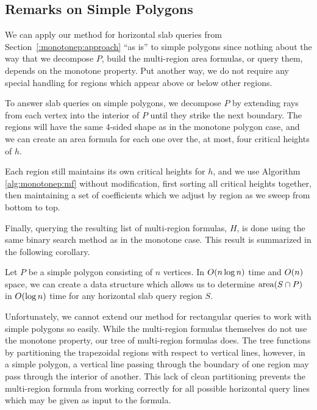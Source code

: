 \subsection{Remarks on Simple Polygons}
\label{:monotonep:simplep}

We can apply our method for horizontal slab queries from Section~\ref{:monotonep:approach} ``as is'' to simple polygons since nothing about the way that we decompose $P$, build the multi-region area formulas, or query them, depends on the monotone property.
Put another way, we do not require any special handling for regions which appear above or below other regions.

To answer slab queries on simple polygons, we decompose $P$ by extending rays from each vertex into the interior of $P$ until they strike the next boundary.  The regions will have the same 4-sided shape as in the monotone polygon case, and we can create an area formula for each one over the, at most, four critical heights of $h$.

Each region still maintains its own critical heights for $h$, and we use Algorithm \ref{alg:monotonep:mf} without modification, first sorting all critical heights together, then maintaining a set of coefficients which we adjust by region as we sweep from bottom to top.

Finally, querying the resulting list of multi-region formulas, $H$, is done using the same binary search method as in the monotone case. This result is summarized in the following corollary.

\begin{corollary}
\label{cor:monotonep:simplep-area}
Let $P$ be a simple polygon consisting of $n$ vertices.
In $O\!\left(n \log{n}\right)$ time and $O\!\left(n\right)$ space, we can create a data structure which allows us to determine $\operatorname{area}\!\left(S \cap P\right)$ in $O\!\left(\log{n}\right)$ time for any horizontal slab query region $S$.
\end{corollary}

Unfortunately, we cannot extend our method for rectangular queries to work with simple polygons so easily.
While the multi-region formulas themselves do not use the monotone property, our tree of multi-region formulas does. 
The tree functions by partitioning the trapezoidal regions with respect to vertical lines, however, in a simple polygon, a vertical line passing through the boundary of one region may pass through the interior of another. 
This lack of clean partitioning prevents the multi-region formula from working correctly for all possible horizontal query lines which may be given as input to the formula.

